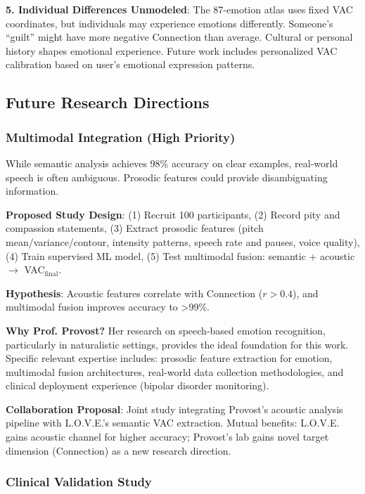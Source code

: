 \documentclass[10pt,twocolumn]{article}
\begin{document}
\textbf{5. Individual Differences Unmodeled}: The 87-emotion atlas uses fixed VAC coordinates, but individuals may experience emotions differently. Someone's ``guilt'' might have more negative Connection than average. Cultural or personal history shapes emotional experience. Future work includes personalized VAC calibration based on user's emotional expression patterns.

\subsection{Future Research Directions}

\subsubsection{Multimodal Integration (High Priority)}

While semantic analysis achieves 98\% accuracy on clear examples, real-world speech is often ambiguous. Prosodic features could provide disambiguating information.

\textbf{Proposed Study Design}: (1) Recruit 100 participants, (2) Record pity and compassion statements, (3) Extract prosodic features (pitch mean/variance/contour, intensity patterns, speech rate and pauses, voice quality), (4) Train supervised ML model, (5) Test multimodal fusion: semantic + acoustic $\rightarrow$ VAC$_{\text{final}}$.

\textbf{Hypothesis}: Acoustic features correlate with Connection ($r > 0.4$), and multimodal fusion improves accuracy to >99\%.

\textbf{Why Prof. Provost?} Her research on speech-based emotion recognition, particularly in naturalistic settings, provides the ideal foundation for this work. Specific relevant expertise includes: prosodic feature extraction for emotion, multimodal fusion architectures, real-world data collection methodologies, and clinical deployment experience (bipolar disorder monitoring).

\textbf{Collaboration Proposal}: Joint study integrating Provost's acoustic analysis pipeline with L.O.V.E.'s semantic VAC extraction. Mutual benefits: L.O.V.E. gains acoustic channel for higher accuracy; Provost's lab gains novel target dimension (Connection) as a new research direction.

\subsubsection{Clinical Validation Study}
\end{document}
